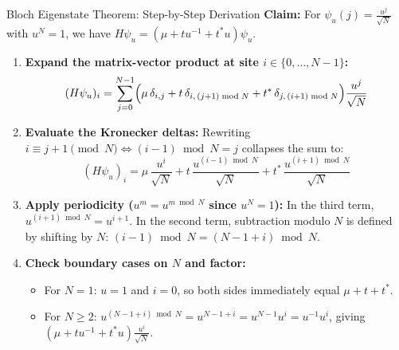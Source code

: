 \documentclass[aspectratio=169, 10pt]{beamer}
\begin{document}
\begin{frame}{Bloch Eigenstate Theorem: Step-by-Step Derivation}
  \textbf{Claim:} For $\psi_u(j) = \frac{u^j}{\sqrt{N}}$ with $u^N = 1$, we have $H\psi_u = (\mu + t u^{-1} + t^* u)\psi_u$.

  \vspace{0.05cm}
  \begin{enumerate}
    \item \textbf{Expand the matrix-vector product at site $i \in \{0, \dots, N-1\}$:}
    \[
      (H\psi_u)_i = \sum_{j=0}^{N-1} \Bigl(\mu\,\delta_{i,j} + t\,\delta_{i,\,(j+1)\bmod N} + t^*\,\delta_{j,\,(i+1)\bmod N}\Bigr)\frac{u^j}{\sqrt{N}}
    \]
    \item \textbf{Evaluate the Kronecker deltas:}
    Rewriting $i \equiv j + 1 \pmod N \iff (i - 1)\bmod N = j$ collapses the sum to:
    \[
      (H\psi_u)_i = \mu\,\frac{u^i}{\sqrt{N}} + t\,\frac{u^{(i - 1)\bmod N}}{\sqrt{N}} + t^*\,\frac{u^{(i + 1)\bmod N}}{\sqrt{N}}
    \]
    \item \textbf{Apply periodicity ($u^m = u^{m \bmod N}$ since $u^N = 1$):}
    In the third term, $u^{(i+1)\bmod N} = u^{i+1}$. In the second term, subtraction modulo $N$ is defined by shifting by $N$: $(i - 1)\bmod N = (N - 1 + i)\bmod N$.
    \item \textbf{Check boundary cases on $N$ and factor:}
    \begin{itemize}
      \item For $N = 1$: $u = 1$ and $i = 0$, so both sides immediately equal $\mu + t + t^*$.
      \item For $N \ge 2$: $u^{(N - 1 + i)\bmod N} = u^{N - 1 + i} = u^{N-1}u^i = u^{-1}u^i$, giving $(\mu + t u^{-1} + t^* u)\frac{u^i}{\sqrt{N}}$.
    \end{itemize}
  \end{enumerate}
\end{frame}
\end{document}
